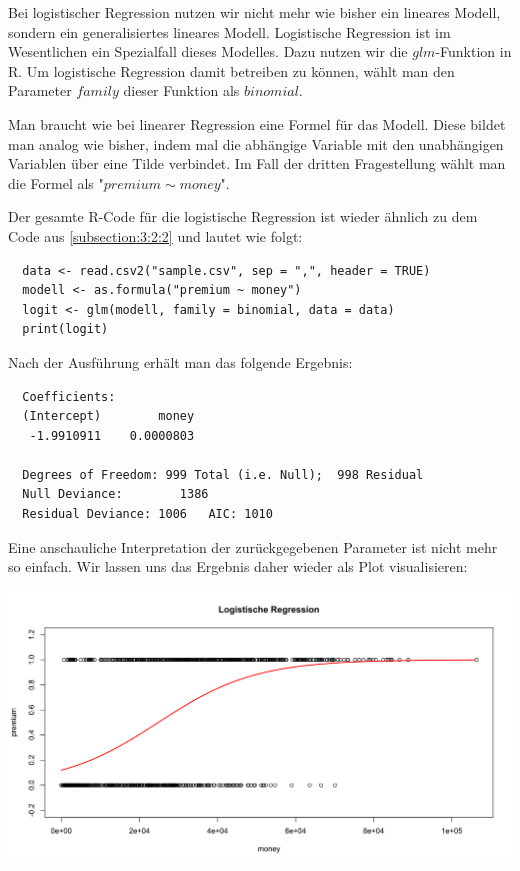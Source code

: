 Bei logistischer Regression nutzen wir nicht mehr wie bisher ein lineares Modell, sondern ein generalisiertes lineares Modell. Logistische Regression ist im Wesentlichen ein Spezialfall dieses Modelles. Dazu nutzen wir die $glm$-Funktion in R. Um logistische Regression damit betreiben zu können, wählt man den Parameter $family$ dieser Funktion als $binomial$.

Man braucht wie bei linearer Regression eine Formel für das Modell. Diese bildet man analog wie bisher, indem mal die abhängige Variable mit den unabhängigen Variablen über eine Tilde verbindet. Im Fall der dritten Fragestellung wählt man die Formel als "$premium \sim money$".

Der gesamte R-Code für die logistische Regression ist wieder ähnlich zu dem Code aus \ref{subsection:3:2:2} und lautet wie folgt:

\begin{verbatim}
  data <- read.csv2("sample.csv", sep = ",", header = TRUE)
  modell <- as.formula("premium ~ money")
  logit <- glm(modell, family = binomial, data = data)
  print(logit)
\end{verbatim}

Nach der Ausführung erhält man das folgende Ergebnis:

\begin{verbatim}
  Coefficients:
  (Intercept)        money
   -1.9910911    0.0000803

  Degrees of Freedom: 999 Total (i.e. Null);  998 Residual
  Null Deviance:	    1386
  Residual Deviance: 1006 	AIC: 1010
\end{verbatim}

Eine anschauliche Interpretation der zurückgegebenen Parameter ist nicht mehr so einfach. Wir lassen uns das Ergebnis daher wieder als Plot visualisieren:

\includegraphics[width=\textwidth]{r-logisticRegression}

